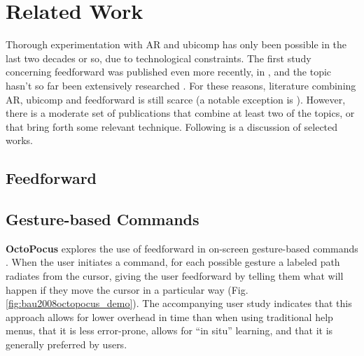 \chapter{Related Work} \label{chap:relat}

Thorough experimentation with AR and ubicomp has only been possible in the last two decades or so, due to technological constraints. The first study concerning feedforward was published even more recently, in \citeyear{djajadiningrat2002but} \cite{djajadiningrat2002but}, and the topic hasn't so far been extensively researched \cite{vermeulen2013crossing}. For these reasons, literature combining AR, ubicomp and feedforward is still scarce (a notable exception is \cite{vermeulen2009bet}). However, there is a moderate set of publications that combine at least two of the topics, or that bring forth some relevant technique. Following is a discussion of selected works.

\section{Feedforward} \label{sec:related_work:feedforward}

\section{Gesture-based Commands} \label{sec:related_work:gesture-based_commands}
\textbf{OctoPocus} explores the use of feedforward in on-screen gesture-based commands \cite{bau2008octopocus}. When the user initiates a command, for each possible gesture a labeled path radiates from the cursor, giving the user feedforward by telling them what will happen if they move the cursor in a particular way (Fig. \ref{fig:bau2008octopocus_demo}). The accompanying user study indicates that this approach allows for lower overhead in time than when using traditional help menus, that it is less error-prone, allows for ``in situ'' learning, and that it is generally preferred by users.

